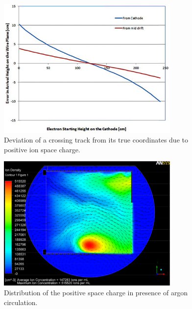 \begin{figure}[htb]
\centering	
\includegraphics[width=0.8\textwidth]{figures/Coordinate.pdf}
\caption{Deviation of a crossing track from its true coordinates due to positive ion space charge.}
\label{Coordinates}
\end{figure}

\begin{figure}[htb]
\centering	
\includegraphics[width=0.8\textwidth]{figures/Voirin.pdf}
\caption{Distribution of the positive space charge in presence of argon circulation.}
\label{Voirin}
\end{figure}


